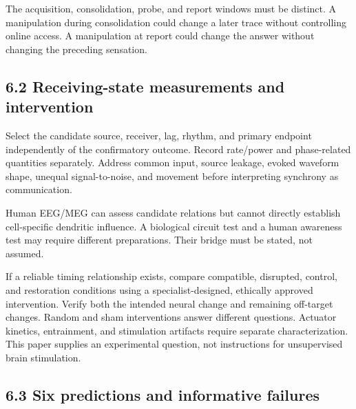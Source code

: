\documentclass[
  american,
  11pt,
  letterpaper,
]{article}
\begin{document}
The acquisition, consolidation, probe, and report windows must be distinct. A manipulation during consolidation could change a later trace without controlling online access. A manipulation at report could change the answer without changing the preceding sensation.

\subsection{6.2 Receiving-state measurements and intervention}\label{receiving-state-measurements-and-intervention}

Select the candidate source, receiver, lag, rhythm, and primary endpoint independently of the confirmatory outcome. Record rate/power and phase-related quantities separately. Address common input, source leakage, evoked waveform shape, unequal signal-to-noise, and movement before interpreting synchrony as communication.

Human EEG/MEG can assess candidate relations but cannot directly establish cell-specific dendritic influence. A biological circuit test and a human awareness test may require different preparations. Their bridge must be stated, not assumed.

If a reliable timing relationship exists, compare compatible, disrupted, control, and restoration conditions using a specialist-designed, ethically approved intervention. Verify both the intended neural change and remaining off-target changes. Random and sham interventions answer different questions. Actuator kinetics, entrainment, and stimulation artifacts require separate characterization. This paper supplies an experimental question, not instructions for unsupervised brain stimulation.

\subsection{6.3 Six predictions and informative failures}\label{six-predictions-and-informative-failures}
\end{document}
